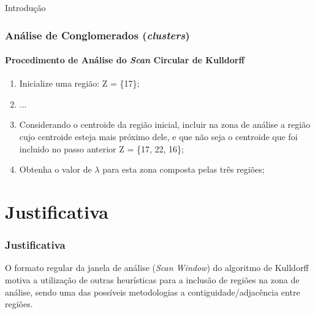 \documentclass[aspectratio=169]{beamer}
\begin{document}
\begin{frame}{Introdução}
\frametitle{Análise de Conglomerados (\textit{clusters})}
\framesubtitle{Procedimento de Análise do \textit{Scan} Circular de Kulldorff}

\fboxsep=0pt
\noindent
\begin{minipage}[t]{0.48\linewidth}
\begin{enumerate}
\item Inicialize uma região: Z = \{17\};
\item ...
\item Considerando o centroide da região inicial, incluir na zona de análise a região cujo centroide esteja mais próximo dele, e que não seja o centroide que foi incluido no passo anterior Z = \{17, 22, 16\};
\item Obtenha o valor de $\lambda$ para esta zona composta pelas três regiões;
\end{enumerate}

\end{minipage}
\hfill%


\end{frame}

\section{Justificativa}
\begin{frame}
\frametitle{Justificativa}
 O formato regular da janela de análise (\textit{Scan Window}) do algoritmo de Kulldorff motiva a utilização de outras heurísticas para a inclusão de regiões na zona de análise, sendo uma das possíveis metodologias a contiguidade/adjacência entre regiões.



\end{frame}
\end{document}
